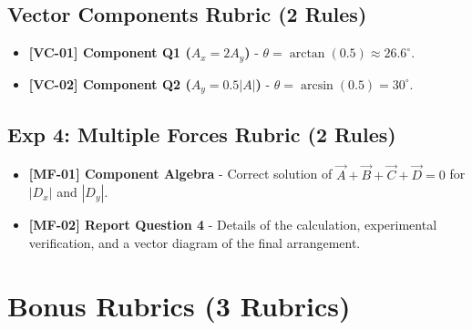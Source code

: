 \documentclass{article}
\begin{document}
\subsection*{ Vector Components Rubric (2 Rules) }
\begin{itemize}
\item \textbf{ [VC-01] Component Q1 ($A_x = 2A_y$) } - $\theta = \arctan(0.5) \approx 26.6^\circ$.
\item \textbf{ [VC-02] Component Q2 ($A_y = 0.5|A|$) } - $\theta = \arcsin(0.5) = 30^\circ$.
\end{itemize}

\subsection*{ Exp 4: Multiple Forces Rubric (2 Rules) }
\begin{itemize}
\item \textbf{ [MF-01] Component Algebra } - Correct solution of $\vec{A} + \vec{B} + \vec{C} + \vec{D} = 0$ for $|D_x|$ and $|D_y|$.
\item \textbf{ [MF-02] Report Question 4 } - Details of the calculation, experimental verification, and a vector diagram of the final arrangement.
\end{itemize}

\section*{Bonus Rubrics (3 Rubrics)}
\end{document}
